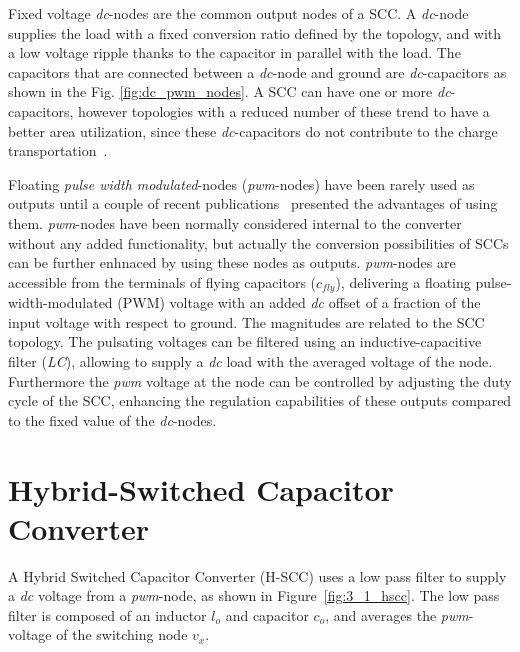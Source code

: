 Fixed voltage \emph{dc}-nodes are the common output nodes of a SCC. A \emph{dc}-node supplies the load with a fixed conversion ratio defined by the topology, and  with a low voltage ripple thanks to the capacitor in parallel with the load. The capacitors that are connected between a \emph{dc}-node and ground are  \emph{dc}-capacitors as shown in the Fig. \ref{fig:dc_pwm_nodes}. A SCC can have one or more \emph{dc}-capacitors, however topologies with a reduced number of these trend to have a better area utilization, since these \emph{dc}-capacitors do not contribute to the charge transportation~\cite{Seeman:EECS-2009-78}.

Floating \emph{pulse width modulated}-nodes (\emph{pwm}-nodes) have been rarely used as outputs until a couple of recent publications~\cite{2012Kumar, 2012Kline} presented the advantages of using them. \emph{pwm}-nodes have been normally considered  internal to the converter without any added functionality, but actually the conversion possibilities of SCCs can be further enhnaced by using these nodes as outputs.
\emph{pwm}-nodes are accessible from the terminals of flying capacitors ($c_{fly}$), delivering a floating pulse-width-modulated (PWM) voltage with an added \emph{dc} offset of a fraction of the input voltage with respect to ground. The magnitudes are related to the SCC topology. The pulsating voltages can be filtered using an inductive-capacitive filter (\emph{LC}), allowing to supply a \emph{dc} load with the averaged voltage of the node. Furthermore the \emph{pwm} voltage at the node can be controlled by adjusting the duty
cycle of the SCC, enhancing the regulation capabilities of these outputs compared to the fixed value of the \emph{dc}-nodes.

\section{Hybrid-Switched Capacitor Converter}
A Hybrid Switched Capacitor Converter (H-SCC) uses a low pass filter to supply a \emph{dc} voltage from a \emph{pwm}-node, as shown in Figure~\ref{fig:3_1_hscc}. The low pass filter is composed of an inductor $l_o$ and capacitor $c_o$, and averages the \emph{pwm}-voltage of the switching node $v_x$.

